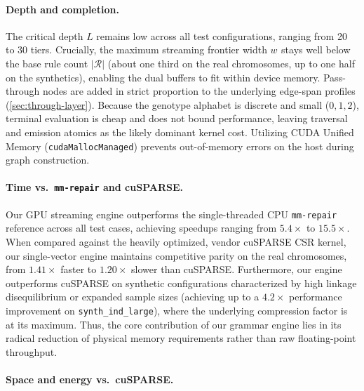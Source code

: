 \documentclass[twoside,leqno,twocolumn]{article}
\begin{document}
\paragraph{Depth and completion.}

The critical depth $L$ remains low across all test configurations, ranging from 20 to 30 tiers. Crucially, the maximum streaming frontier width $w^{}$ stays well below the base rule count $|\mathcal{R}|$ (about one third on the real chromosomes, up to one half on the synthetics), enabling the dual buffers to fit within device memory. Pass-through nodes are added in strict proportion to the underlying edge-span profiles (\cref{sec:through-layer}). Because the genotype alphabet is discrete and small (${0,1,2}$), terminal evaluation is cheap and does not bound performance, leaving traversal and emission atomics as the likely dominant kernel cost. Utilizing CUDA Unified Memory (\texttt{cudaMallocManaged}) prevents out-of-memory errors on the host during graph construction.

\paragraph{Time vs.\ \texttt{mm-repair} and cuSPARSE.}

Our GPU streaming engine outperforms the single-threaded CPU \texttt{mm-repair} reference across all test cases, achieving speedups ranging from $5.4\times$ to $15.5\times$. When compared against the heavily optimized, vendor cuSPARSE CSR kernel, our single-vector engine maintains competitive parity on the real chromosomes, from $1.41\times$ faster to $1.20\times$ slower than cuSPARSE. Furthermore, our engine outperforms cuSPARSE on synthetic configurations characterized by high linkage disequilibrium or expanded sample sizes (achieving up to a $4.2\times$ performance improvement on \texttt{synth\_ind\_large}), where the underlying compression factor is at its maximum. Thus, the core contribution of our grammar engine lies in its radical reduction of physical memory requirements rather than raw floating-point throughput.

\begin{table}[t]
\caption{Genotype average time per right matrix--vector product (ms/vector) on the GB10 node.}
\label{tab:geno_time}
\centering\footnotesize

\end{table}

\paragraph{Space and energy vs.\ cuSPARSE.}
\end{document}
